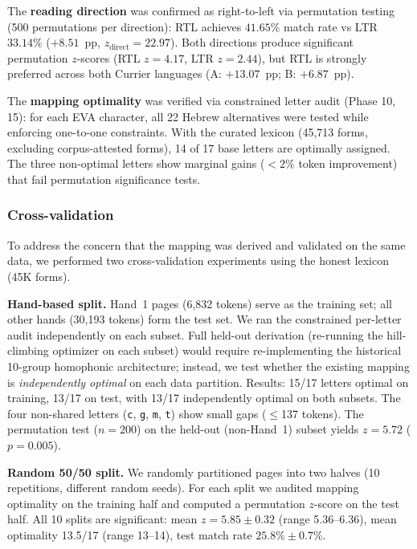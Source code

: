\documentclass[11pt,a4paper]{article}
\newcommand{\eva}[1]{\texttt{#1}}
\newcommand{\zs}[1]{$z=#1$}
\newcommand{\pval}[1]{$p=#1$}
\begin{document}
The \textbf{reading direction} was confirmed as right-to-left via permutation
testing (500 permutations per direction): RTL achieves $41.65\%$ match rate
vs LTR $33.14\%$ ($+8.51$~pp, $z_{\mathrm{direct}}=22.97$). Both directions
produce significant permutation $z$-scores (RTL $z=4.17$, LTR $z=2.44$),
but RTL is strongly preferred across both Currier languages (A: $+13.07$~pp;
B: $+6.87$~pp).

The \textbf{mapping optimality} was verified via constrained letter audit
(Phase 10, 15): for each EVA character, all 22 Hebrew alternatives were
tested while enforcing one-to-one constraints. With the curated lexicon
(45,713 forms, excluding corpus-attested forms), 14 of 17 base letters are
optimally assigned. The three non-optimal letters show marginal gains
($<2\%$ token improvement) that fail permutation significance tests.

\subsubsection*{Cross-validation}
\label{sec:crossval}

To address the concern that the mapping was derived and validated on the
same data, we performed two cross-validation experiments using the honest
lexicon (45K forms).

\textbf{Hand-based split.}
Hand~1 pages (6,832 tokens) serve as the training set; all other hands
(30,193 tokens) form the test set. We ran the constrained per-letter
audit independently on each subset. Full held-out derivation
(re-running the hill-climbing optimizer on each subset) would require
re-implementing the historical 10-group homophonic architecture; instead,
we test whether the existing mapping is \emph{independently optimal} on
each data partition. Results: 15/17 letters optimal on training, 13/17
on test, with 13/17 independently optimal on both subsets.
The four non-shared letters (\eva{c}, \eva{g}, \eva{m}, \eva{t}) show
small gaps ($\le$137 tokens).
The permutation test ($n=200$) on the held-out
(non-Hand~1) subset yields \zs{5.72} (\pval{0.005}).

\textbf{Random 50/50 split.}
We randomly partitioned pages into two halves (10 repetitions, different
random seeds). For each split we audited mapping optimality on the training
half and computed a permutation $z$-score on the test half.
All 10 splits are significant: mean \zs{5.85 \pm 0.32} (range 5.36--6.36),
mean optimality 13.5/17 (range 13--14), test match rate $25.8\% \pm 0.7\%$.
\end{document}
